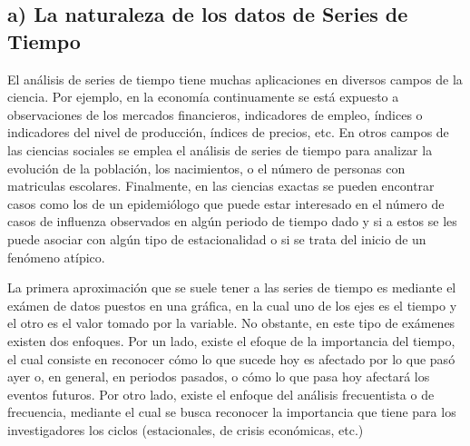 \documentclass[
  a4paper,
]{article}
\begin{document}
\hypertarget{a-la-naturaleza-de-los-datos-de-series-de-tiempo}{%
\subsection{a) La naturaleza de los datos de Series de
Tiempo}\label{a-la-naturaleza-de-los-datos-de-series-de-tiempo}}

El análisis de series de tiempo tiene muchas aplicaciones en diversos
campos de la ciencia. Por ejemplo, en la economía continuamente se está
expuesto a observaciones de los mercados financieros, indicadores de
empleo, índices o indicadores del nivel de producción, índices de
precios, etc. En otros campos de las ciencias sociales se emplea el
análisis de series de tiempo para analizar la evolución de la población,
los nacimientos, o el número de personas con matriculas escolares.
Finalmente, en las ciencias exactas se pueden encontrar casos como los
de un epidemiólogo que puede estar interesado en el número de casos de
influenza observados en algún periodo de tiempo dado y si a estos se les
puede asociar con algún tipo de estacionalidad o si se trata del inicio
de un fenómeno atípico.

La primera aproximación que se suele tener a las series de tiempo es
mediante el exámen de datos puestos en una gráfica, en la cual uno de
los ejes es el tiempo y el otro es el valor tomado por la variable. No
obstante, en este tipo de exámenes existen dos enfoques. Por un lado,
existe el efoque de la importancia del tiempo, el cual consiste en
reconocer cómo lo que sucede hoy es afectado por lo que pasó ayer o, en
general, en periodos pasados, o cómo lo que pasa hoy afectará los
eventos futuros. Por otro lado, existe el enfoque del análisis
frecuentista o de frecuencia, mediante el cual se busca reconocer la
importancia que tiene para los investigadores los ciclos (estacionales,
de crisis económicas, etc.)
\end{document}

